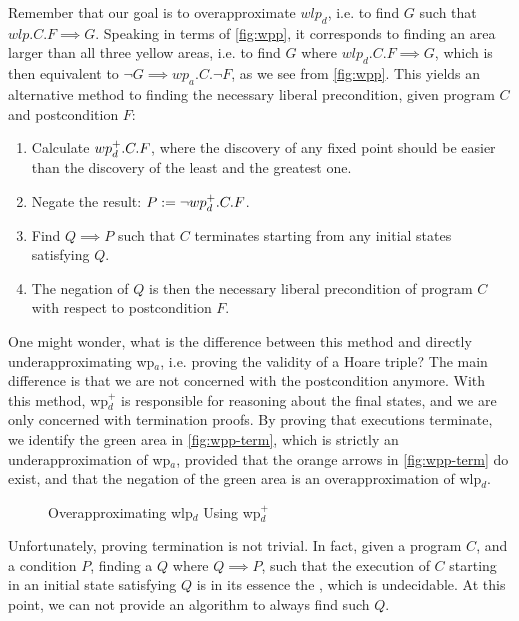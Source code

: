 Remember that our goal is to overapproximate $wlp_d$, i.e. to find $G$ such that $wlp.C.F\implies G$.
Speaking in terms of \autoref{fig:wpp}, it corresponds to finding an area larger than all three yellow areas, i.e. to find $G$ where $wlp_d.C.F\implies G$, which is then equivalent to $\neg G \implies wp_a.C.\neg F$, as we see from \autoref{fig:wpp}. 
This yields an alternative method to finding the necessary liberal precondition, given program $C$ and postcondition $F$:
\begin{enumerate}
	\item Calculate $wp_d^+.C.F$, where the discovery of any fixed point should be easier than the discovery of the least and the greatest one. 
	\item Negate the result: $P:=\neg wp_d^+.C.F $.
	\item Find $Q\implies P$ such that $C$  terminates starting from any initial states satisfying $Q$.  
	\item The negation of $Q$ is then the necessary liberal precondition of program $C$ with respect to postcondition $F$.
\end{enumerate}

One might wonder, what is the difference between this method and directly underapproximating wp$_a$, i.e. proving the validity of a Hoare triple? 
The main difference is that we are not concerned with the postcondition anymore. 
With this method, wp$_d^+$ is responsible for reasoning about the final states, and we are only concerned with termination proofs. 
By proving that  executions terminate, we identify the green area in \autoref{fig:wpp-term}, which is strictly an underapproximation of wp$_a$, provided that the orange arrows in \autoref{fig:wpp-term} do exist, and that the negation of the green area is an overapproximation of wlp$_d$. 

\begin{figure}[ht]
	\centering
	
	\caption{Overapproximating wlp$_d$ Using wp$_d^+$}
	\label{fig:wpp-term}
\end{figure}

Unfortunately, proving termination is not trivial. 
In fact, given a program $C$, and a condition $P$, finding a $Q$ where $Q\implies P$, such that the execution of $C$ starting in an initial state satisfying $Q$ is in its essence the , which is undecidable. 
At this point, we can not provide an algorithm to always find such $Q$. 

